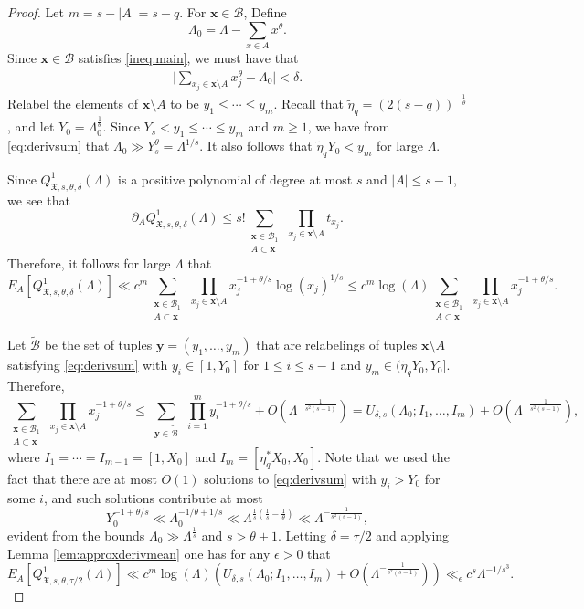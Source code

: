 \documentclass[11pt,reqno]{amsart}
\numberwithin{equation}{section}
\begin{document}
\begin{proof} Let $m = s-|A| = s-q$. For $\mathbf{x} \in \mathcal{B}$, Define 
\[ \Lambda_0 = \Lambda-\sum_{x\in A} x^{\theta}. \]
Since $\mathbf{x} \in \mathcal{B}$ satisfies \eqref{ineq:main}, we must have that 
\begin{align} \label{eq:derivsum}
\Big| \sum_{x_j \in \mathbf{x} \setminus A} x_j^{\theta} - \Lambda_0 \Big| < \delta. 
\end{align}
Relabel the elements of $\mathbf{x} \setminus A$ to be $y_1 \leq \cdots \leq y_m$. Recall that $\tilde\eta_q = (2(s-q))^{-\frac{1}{\theta}}$, and let $Y_0 = \Lambda_0^{\frac{1}{\theta}}$. Since $Y_s < y_1 \leq  \cdots \leq y_m$ and $m \geq 1$, we have from \eqref{eq:derivsum} that $\Lambda_0 \gg Y_s^{\theta} = \Lambda^{1/s}$. It also follows that $\tilde\eta_qY_0 < y_m$ for large $\Lambda$. 

Since $Q^1_{\mathfrak{X},s,\theta,\delta}(\Lambda)$ is a positive polynomial of degree at most $s$ and $|A| \leq s-1$, we see that 
\[ \partial_A Q^1_{\mathfrak{X},s,\theta,\delta}(\Lambda) \leq s! \sum_{\substack{\mathbf{x} \in \mathcal{B}_1 \\ A \subset \mathbf{x}}} \, \prod_{x_j \in \mathbf{x}\setminus A} t_{x_j} . \]
Therefore, it follows for large $\Lambda$ that 
\[ E_A[Q^1_{\mathfrak{X},s,\theta,\delta}(\Lambda)] \ll c^m \sum_{\substack{\mathbf{x} \in \mathcal{B}_1 \\ A \subset \mathbf{x}}} \, \prod_{x_j \in \mathbf{x}\setminus A} x_j^{-1+\theta/s}\log(x_j)^{1/s} \leq c^m \log(\Lambda) \sum_{\substack{\mathbf{x} \in \mathcal{B}_1 \\ A \subset \mathbf{x}}} \, \prod_{x_j \in \mathbf{x}\setminus A} x_j^{-1+\theta/s}. \]

Let $\widetilde{\mathcal{B}}$ be the set of tuples $\mathbf{y} = (y_1,\ldots,y_m)$ that are relabelings of tuples $\mathbf{x}\setminus A$ satisfying \eqref{eq:derivsum}
with $y_i \in [1,Y_0]$ for $1 \leq i \leq s-1$ and $y_m \in (\tilde\eta_qY_0,Y_0]$. Therefore, 
\[ \sum_{\substack{\mathbf{x} \in \mathcal{B}_1 \\ A \subset \mathbf{x}}} \, \prod_{x_j \in \mathbf{x}\setminus A} x_j^{-1+\theta/s} \leq \sum_{\substack{\mathbf{y} \in \mathcal{\widetilde{B}}}} \, \prod_{i = 1}^m y_i^{-1+\theta/s} +O(\Lambda^{-\frac{1}{s^2(s-1)}}) = U_{\delta,s}(\Lambda_0; I_1,\ldots,I_m)+O(\Lambda^{-\frac{1}{s^2(s-1)}}), \]
where $I_1 = \cdots = I_{m-1} = [1,X_0]$ and $I_m = [\eta_q^*X_0,X_0]$. Note that we used the fact that there are at most $O(1)$ solutions to \eqref{eq:derivsum} with $y_i > Y_0$ for some $i$, and such solutions contribute at most 
\[ Y_0^{-1+\theta/s} \ll \Lambda_0^{-1/\theta+1/s} \ll \Lambda^{\frac{1}{s}(\frac{1}{s}-\frac{1}{\theta})} \ll \Lambda^{-\frac{1}{s^2(s-1)}}, \] 
evident from the bounds $\Lambda_0 \gg \Lambda^{\frac{1}{s}}$ and $s > \theta+1$. Letting $\delta = \tau/2$ and applying Lemma \ref{lem:approxderivmean} one has for any $\epsilon > 0$ that 
\[ E_A[Q^1_{\mathfrak{X},s,\theta,\tau/2}(\Lambda)] \ll c^m \log(\Lambda) (U_{\delta,s}(\Lambda_0; I_1,\ldots,I_m)+O(\Lambda^{-\frac{1}{s^2(s-1)}})) \ll_{\epsilon} c^s \Lambda^{-1/s^3}. \]
\end{proof}
\end{document}
